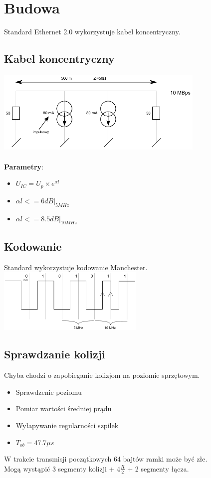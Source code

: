 	\section{Budowa}
		Standard Ethernet 2.0 wykorzystuje kabel koncentryczny.
		\subsection{Kabel koncentryczny}
			\includegraphics[width=10cm]{./images/image27.pdf}\\\\
			\textbf{Parametry}:
			\begin{itemize}
				\item $ U_{IC}=U_{p}\times e^{\alpha{l}} $
				\item $ \alpha{l} <= 6 dB|_{5 MHz} $
				\item $ \alpha{l} <= 8.5 dB|_{10 MHz} $
			\end{itemize}
		\subsection{Kodowanie}
			Standard wykorzystuje kodowanie Manchester.\\
			\includegraphics[width=7cm]{./images/image28.pdf}
		\subsection{Sprawdzanie kolizji}
			Chyba chodzi o zapobieganie kolizjom na poziomie sprzętowym.
			\begin{itemize}
				\item Sprawdzenie poziomu
				\item Pomiar wartości średniej prądu
				\item Wyłapywanie regularności szpilek
				\item $ T_{ob}=47.7 \mu{s} $
			\end{itemize}
			W trakcie transmisji początkowych 64 bajtów ramki może być złe.\\
			Mogą wystąpić 3 segmenty kolizji + $ 4 \frac{R}{2} $ + 2 segmenty łącza.
